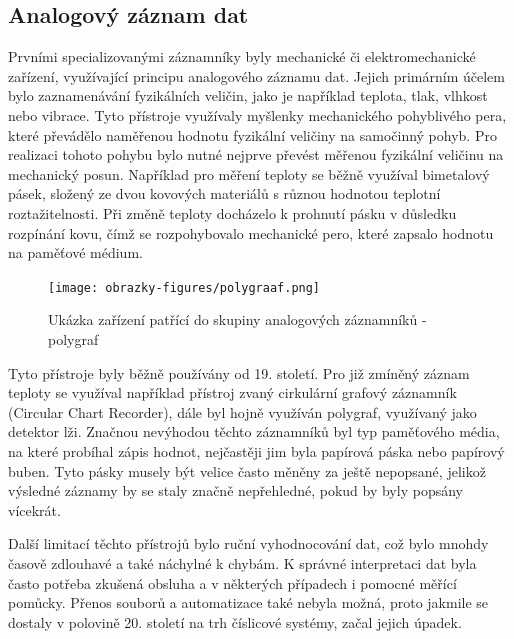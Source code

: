   
\subsection{Analogový záznam dat} %
\label{moznosti_zaznamu_dat}
Prvními specializovanými záznamníky byly mechanické či elektromechanické zařízení, využívající principu analogového záznamu dat. Jejich primárním účelem bylo 
zaznamenávání fyzikálních veličin, jako je například teplota, tlak, vlhkost nebo vibrace. Tyto přístroje využívaly myšlenky mechanického pohyblivého pera, 
které převádělo naměřenou hodnotu fyzikální veličiny na samočinný pohyb. Pro realizaci tohoto pohybu bylo nutné nejprve převést měřenou fyzikální veličinu na 
mechanický posun. Například pro měření teploty se běžně využíval bimetalový pásek, složený ze dvou kovových materiálů s různou hodnotou teplotní 
roztažitelnosti. Při změně teploty docházelo k prohnutí pásku v důsledku rozpínání kovu, čímž se rozpohybovalo mechanické pero, které zapsalo hodnotu na 
paměťové médium. 


\begin{figure}[h] %
    \centering
    \texttt{[image: obrazky-figures/polygraaf.png]}
    \caption{Ukázka zařízení patřící do skupiny analogových záznamníků - polygraf \cite{polygraph_picture}}
    \label{fig:polygraaf}
\end{figure}


Tyto přístroje byly běžně používány od 19. století. Pro již zmíněný záznam teploty se využíval například přístroj zvaný cirkulární grafový záznamník (Circular 
Chart Recorder), dále byl hojně využíván polygraf, využívaný jako detektor lži. Značnou nevýhodou těchto záznamníků byl typ paměťového média, na které probíhal 
zápis hodnot, nejčastěji jim byla papírová páska nebo papírový buben. Tyto pásky musely být velice často měněny za ještě nepopsané, jelikož výsledné záznamy by 
se staly značně nepřehledné, pokud by byly popsány vícekrát.

Další limitací těchto přístrojů bylo ruční vyhodnocování dat, což bylo mnohdy časově zdlouhavé a také náchylné k chybám. K správné interpretaci dat byla často 
potřeba zkušená obsluha a v některých případech i pomocné měřící pomůcky. Přenos souborů a automatizace také nebyla možná, proto jakmile se dostaly v polovině 
20. století na trh číslicové systémy, začal jejich úpadek. \cite{newcastle_history_of_digital_computers, florian_prechod_a_analog_do_digital}

